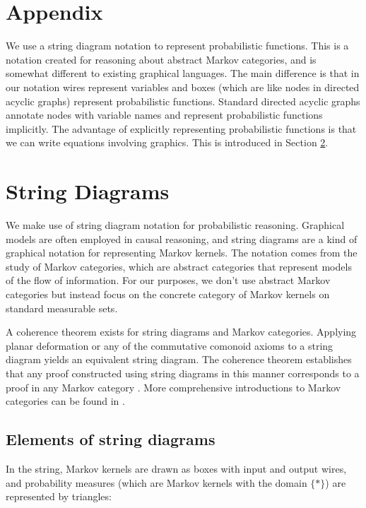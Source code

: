 

\section{Appendix}


We use a string diagram notation to represent probabilistic functions. This is a notation created for reasoning about abstract Markov categories, and is somewhat different to existing graphical languages. The main difference is that in our notation wires represent variables and boxes (which are like nodes in directed acyclic graphs) represent probabilistic functions. Standard directed acyclic graphs annotate nodes with variable names and represent probabilistic functions implicitly. The advantage of explicitly representing probabilistic functions is that we can write equations involving graphics. This is introduced in Section \ref{ssec:mken_diagrams}.


\section{String Diagrams}\label{ssec:mken_diagrams}

We make use of string diagram notation for probabilistic reasoning. Graphical models are often employed in causal reasoning, and string diagrams are a kind of graphical notation for representing Markov kernels. The notation comes from the study of Markov categories, which are abstract categories that represent models of the flow of information. For our purposes, we don't use abstract Markov categories but instead focus on the concrete category of Markov kernels on standard measurable sets.

A coherence theorem exists for string diagrams and Markov categories. Applying planar deformation or any of the commutative comonoid axioms to a string diagram yields an equivalent string diagram. The coherence theorem establishes that any proof constructed using string diagrams in this manner corresponds to a proof in any Markov category \citep{selinger_survey_2011}. More comprehensive introductions to Markov categories can be found in \citet{fritz_synthetic_2020,cho_disintegration_2019}.

\subsection{Elements of string diagrams}\label{sec:string_diagram_elements}

In the string, Markov kernels are drawn as boxes with input and output wires, and probability measures (which are Markov kernels with the domain $\{*\}$) are represented by triangles:

